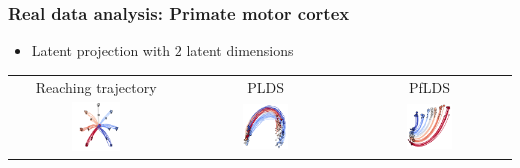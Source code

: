 \documentclass[16pt,presentation]{beamer}
\begin{document}
\begin{frame}
\frametitle{Real data analysis: Primate motor cortex}
\begin{itemize}
\item Latent projection with $2$ latent dimensions
\end{itemize}
\begin{tabular}{ ccc } 
{\small Reaching trajectory} & {\small PLDS} & {\small PfLDS} \\
\includegraphics[width = 0.30\textwidth]{./figs/flds/fig_GeorgeMove_trajectory.pdf}&
\includegraphics[width = 0.30\textwidth]{./figs/flds/fig_GeorgeMove_2dvisual_mat_PLDS.pdf}&
\includegraphics[width = 0.30\textwidth]{./figs/flds/fig_GeorgeMove_2dvisual_py_PLDS.pdf}
\end{tabular}
\end{frame}
\end{document}
